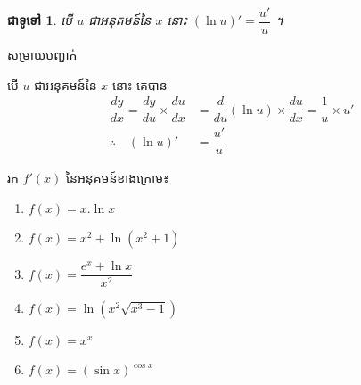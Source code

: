\documentclass[12pt,fleqn]{book} %
\newtheorem{general}{\kml ជាទូទៅ}
\newcommand{\solution}{{\begin{center}\kml \color{magenta} សម្រាយបញ្ជាក់\end{center} }}
\begin{document}
\begin{general}
បើ $u$ ជាអនុគមន៍នៃ $x$ នោះ $(\ln u)'=\dfrac{u'}{u}$ ។ 
\end{general}
\solution 
បើ $u$ ជាអនុគមន៍នៃ $x$ នោះ  គេបាន 
\begin{align*}
\dfrac{dy}{dx}=\dfrac{dy}{du}\times \dfrac{du}{dx}&=\dfrac{d}{du}(\ln u)\times \dfrac{du}{dx}=\dfrac{1}{u}\times u'\\
\therefore \quad (\ln u)'&=\dfrac{u'}{u}
\end{align*}
\begin{example}
រក $f'(x)$ នៃអនុគមន៍ខាងក្រោម៖
\begin{multicols}{2}
\begin{enumerate}
\item $f(x)=x.\ln x$
\item $f(x)=x^2+\ln (x^2+1)$
\item $f(x)=\dfrac{e^x+\ln x}{x^2}$
\item $f(x)=\ln (x^2 \sqrt{x^3-1})$
\item $f(x)=x^x$
\item $f(x)=(\sin x)^{\cos x}$
\end{enumerate}
\end{multicols}
\end{example}
\end{document}
